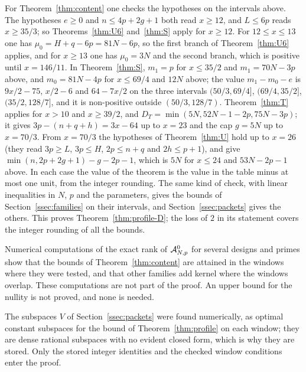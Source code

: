 For Theorem~\ref{thm:content} one checks the hypotheses on the intervals above. The hypotheses
$e\ge0$ and $n\le4p+2g+1$ both read $x\ge12$, and $L\le6p$ reads $x\ge35/3$; so Theorems~\ref{thm:U6}
and~\ref{thm:S} apply for $x\ge12$. For $12\le x\le13$ one has $\mu_0=H+q-6p=81N-6p$, so the first branch
of Theorem~\ref{thm:U6} applies, and for $x\ge13$ one has $\mu_0=3N$ and the second branch, which is positive
until $x=146/11$. In Theorem~\ref{thm:S}, $m_1=p$ for $x\le35/2$ and $m_1=70N-3p$ above, and
$m_0=81N-4p$ for $x\le69/4$ and $12N$ above; the value $m_1-m_0-e$ is $9x/2-75$, $x/2-6$ and
$64-7x/2$ on the three intervals $(50/3,69/4]$, $(69/4,35/2]$, $(35/2,128/7]$, and it is non-positive
outside $(50/3,128/7)$. Theorem~\ref{thm:T} applies for $x>10$ and $x\ge39/2$, and
$D_T=\min(5N,52N-1-2p,75N-3p)$; it gives $3p-(n+q+h)=3x-64$ up to $x=23$ and the cap $g=5N$ up to
$x=70/3$. From $x=70/3$ the hypotheses of Theorem~\ref{thm:U} hold up to $x=26$ (they read
$3p\ge L$, $3p\le H$, $2p\le n+q$ and $2h\le p+1$), and give $\min(n,2p+2g+1)-g-2p-1$, which is $5N$ for
$x\le24$ and $53N-2p-1$ above. In each case the value of the theorem is the value in the table minus at
most one unit, from the integer rounding. The same kind of check, with linear inequalities in $N$, $p$
and the parameters, gives the bounds of Section~\ref{ssec:families} on their intervals, and
Section~\ref{ssec:packets} gives the others. This proves Theorem~\ref{thm:profile-D}; the loss of $2$ in its
statement covers the integer rounding of all the bounds.

\begin{remark}
Numerical computations of the exact rank of $\mathcal A^0_{N,p}$ for several designs and primes show that the
bounds of Theorem~\ref{thm:content} are attained in the windows where they were tested, and that other
families add kernel where the windows overlap. These computations are not part of the proof. An upper bound
for the nullity is not proved, and none is needed.
\end{remark}

\begin{remark}
The subspaces $V$ of Section~\ref{ssec:packets} were found numerically, as optimal constant subspaces for the
bound of Theorem~\ref{thm:profile} on each window; they are dense rational subspaces with no evident closed
form, which is why they are stored. Only the stored integer identities and the checked window conditions
enter the proof.
\end{remark}

